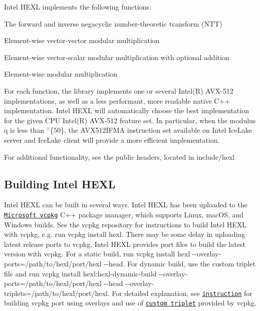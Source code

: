 Intel H\+E\+XL implements the following functions\+:
\begin{DoxyItemize}
\item The forward and inverse negacyclic number-\/theoretic transform (N\+TT)
\item Element-\/wise vector-\/vector modular multiplication
\item Element-\/wise vector-\/scalar modular multiplication with optional addition
\item Element-\/wise modular multiplication
\end{DoxyItemize}

For each function, the library implements one or several Intel(\+R) A\+V\+X-\/512 implementations, as well as a less performant, more readable native C++ implementation. Intel H\+E\+XL will automatically choose the best implementation for the given C\+PU Intel(\+R) A\+V\+X-\/512 feature set. In particular, when the modulus {\ttfamily q} is less than {$^\wedge$\{50\}}, the A\+V\+X512\+I\+F\+MA instruction set available on Intel Ice\+Lake server and Ice\+Lake client will provide a more efficient implementation.

For additional functionality, see the public headers, located in {\ttfamily include/hexl}

\subsection*{Building Intel H\+E\+XL}

Intel H\+E\+XL can be built in several ways. Intel H\+E\+XL has been uploaded to the \href{https://github.com/microsoft/vcpkg}{\tt Microsoft vcpkg} C++ package manager, which supports Linux, mac\+OS, and Windows builds. See the vcpkg repository for instructions to build Intel H\+E\+XL with vcpkg, e.\+g. run {\ttfamily vcpkg install hexl}. There may be some delay in uploading latest release ports to vcpkg. Intel H\+E\+XL provides port files to build the latest version with vcpkg. For a static build, run {\ttfamily vcpkg install hexl -\/-\/overlay-\/ports=/path/to/hexl/port/hexl -\/-\/head}. For dynamic build, use the custom triplet file and run {\ttfamily vcpkg install hexl\+:hexl-\/dynamic-\/build -\/-\/overlay-\/ports=/path/to/hexl/port/hexl -\/-\/head -\/-\/overlay-\/triplets=/path/to/hexl/port/hexl}. For detailed explanation, see \href{https://devblogs.microsoft.com/cppblog/registries-bring-your-own-libraries-to-vcpkg/}{\tt instruction} for building vcpkg port using overlays and use of \href{https://github.com/microsoft/vcpkg/blob/master/docs/examples/overlay-triplets-linux-dynamic.md#building-dynamic-libraries-on-linux}{\tt custom triplet} provided by vcpkg.

